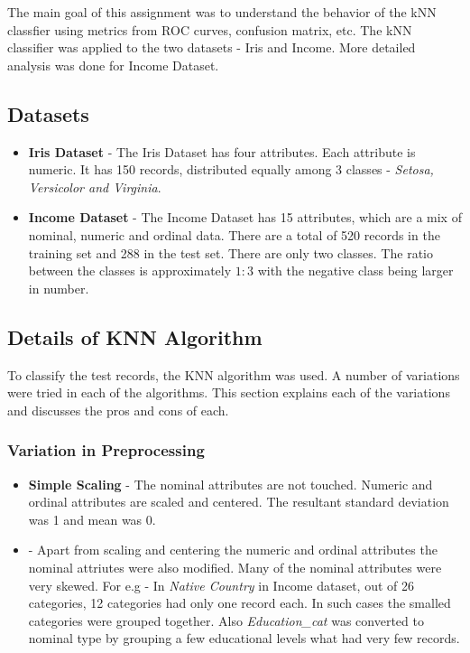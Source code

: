 The main goal of this assignment was to understand the behavior of the kNN classfier using metrics from ROC curves, confusion matrix, etc.
The kNN classifier was applied to the two datasets - Iris and Income. More detailed analysis was done for Income Dataset.
\subsection{Datasets}
\begin{itemize}
\item \textbf{Iris Dataset} - The Iris Dataset has four attributes. Each attribute is numeric. It has 150 records, distributed equally among 3 classes - \emph{Setosa, Versicolor and Virginia}.
\item \textbf{Income Dataset} - The Income Dataset has 15 attributes, which are a mix of nominal, numeric and ordinal data. There are a total of 520 records in the training set and 288 in the test set. There are only two classes. The ratio between the classes is approximately $1:3$ with the negative class being larger in number.
\end{itemize}
\subsection{Details of KNN Algorithm}
To classify the test records, the KNN algorithm was used. A number of variations were tried in each of the algorithms. This section explains each of the variations and discusses the pros and cons of each.
\subsubsection{Variation in Preprocessing}
 \begin{itemize}
 	\item \textbf{Simple Scaling} - The nominal attributes are not touched. Numeric and ordinal attributes are scaled and centered. The resultant standard deviation was 1 and mean was 0.
 	\item {} - Apart from scaling and centering the numeric and ordinal attributes the nominal attriutes were also modified. Many of the nominal attributes were very skewed. For e.g - In \emph{Native Country} in Income dataset, out of 26 categories, 12 categories had only one record each. In such cases the smalled categories were grouped together. Also \emph{Education_cat} was converted to nominal type by grouping a few educational levels what had very few records.
 \end{itemize}
